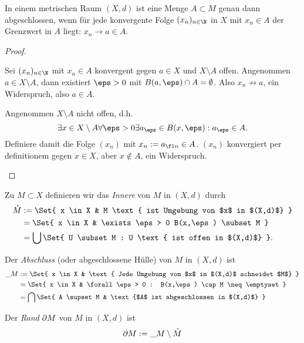 \begin{prop} \label{thm:metric_space_closed_subset_convergent_sequences}
	In einem metrischen Raum $(X,d)$ ist eine Menge $A \subset M$ genau dann abgeschlossen,
	wenn für jede konvergente Folge $(x_n)_{n\in\N}$ in $X$ mit $x_n \in A$ der Grenzwert in $A$ liegt: $x_n \to a \in A$.
	\begin{proof}
		\begin{segnb}[„$\implies$“]
			Sei $(x_n)_{n\in\N}$ mit $x_n \in A$ konvergent gegen $a \in X$ und $X \setminus A$ offen.
			Angenommen $a \in X \setminus A$, dann existiert $\eps > 0$ mit $B(a,\eps) \cap A = \emptyset$.
			Also $x_n \not\to a$, ein Widerspruch, also $a \in A$.
		\end{segnb}
		\begin{segnb}[„$\impliedby$“]
			Angenommen $X \setminus A$ nicht offen, d.h.
			\[
				\exists x \in X \setminus A \forall \eps > 0 \exists a_\eps \in B(x,\eps) : a_\eps \in A.
			\]
			Definiere damit die Folge $(x_n)$ mit $x_n := a_{\f 1n} \in A$.
			$(x_n)$ konvergiert per definitionem gegen $x \in X$, aber $x \not\in A$, ein Widerspruch.
		\end{segnb}
	\end{proof}
\end{prop}

\begin{df}
	Zu $M \subset X$ definieren wir das \emph{Innere} von $M$ in $(X,d)$ durch
	\begin{align*}
		\mathring M &:= \Set{ x \in X & M \text{ ist Umgebung von $x$ in $(X,d)$} } \\
		&= \Set{ x \in X & \exists \eps > 0 B(x,\eps) \subset M } \\
		&= \bigcup \Set{ U \subset M : U \text{ ist offen in $(X,d)$} }.
	\end{align*}

	Der \emph{Abschluss} (oder abgeschlossene Hülle) von $M$ in $(X,d)$ ist
	\begin{align*}
		\_{M} &:= \Set{ x \in X & \text{ Jede Umgebung von $x$ in $(X,d)$ schneidet $M$} } \\
		&= \Set{ x \in X & \forall \eps > 0 : B(x,\eps) \cap M \neq \emptyset } \\
		&= \bigcap \Set{ A \supset M & \text{$A$ ist abgeschlossen in $(X,d)$} }
	\end{align*}

	Der \emph{Rand} $\partial M$ von $M$ in $(X,d)$ ist
	\[
		\partial M := \_{M} \setminus \mathring M
	\]
\end{df}

